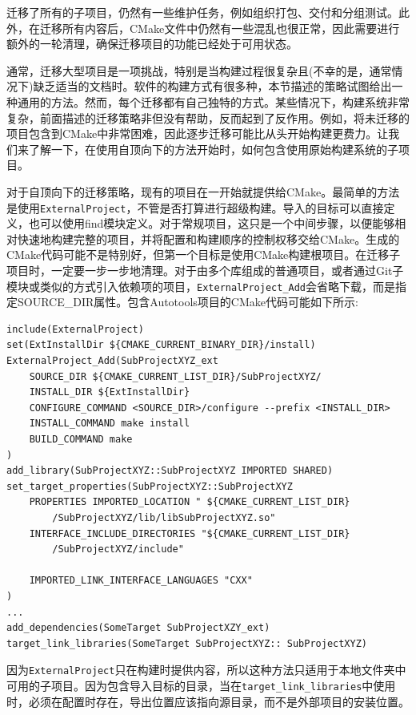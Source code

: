 迁移了所有的子项目，仍然有一些维护任务，例如组织打包、交付和分组测试。此外，在迁移所有内容后，CMake文件中仍然有一些混乱也很正常，因此需要进行额外的一轮清理，确保迁移项目的功能已经处于可用状态。

通常，迁移大型项目是一项挑战，特别是当构建过程很复杂且(不幸的是，通常情况下)缺乏适当的文档时。软件的构建方式有很多种，本节描述的策略试图给出一种通用的方法。然而，每个迁移都有自己独特的方式。某些情况下，构建系统非常复杂，前面描述的迁移策略非但没有帮助，反而起到了反作用。例如，将未迁移的项目包含到CMake中非常困难，因此逐步迁移可能比从头开始构建更费力。让我们来了解一下，在使用自顶向下的方法开始时，如何包含使用原始构建系统的子项目。


对于自顶向下的迁移策略，现有的项目在一开始就提供给CMake。最简单的方法是使用\texttt{ExternalProject}，不管是否打算进行超级构建。导入的目标可以直接定义，也可以使用find模块定义。对于常规项目，这只是一个中间步骤，以便能够相对快速地构建完整的项目，并将配置和构建顺序的控制权移交给CMake。生成的CMake代码可能不是特别好，但第一个目标是使用CMake构建根项目。在迁移子项目时，一定要一步一步地清理。对于由多个库组成的普通项目，或者通过Git子模块或类似的方式引入依赖项的项目，\texttt{ExternalProject\_Add}会省略下载，而是指定SOURCE\_DIR属性。包含Autotools项目的CMake代码可能如下所示:

\begin{lstlisting}[style=styleCMake]
include(ExternalProject)
set(ExtInstallDir ${CMAKE_CURRENT_BINARY_DIR}/install)
ExternalProject_Add(SubProjectXYZ_ext
	SOURCE_DIR ${CMAKE_CURRENT_LIST_DIR}/SubProjectXYZ/
	INSTALL_DIR ${ExtInstallDir}
	CONFIGURE_COMMAND <SOURCE_DIR>/configure --prefix <INSTALL_DIR>
	INSTALL_COMMAND make install
	BUILD_COMMAND make
)
add_library(SubProjectXYZ::SubProjectXYZ IMPORTED SHARED)
set_target_properties(SubProjectXYZ::SubProjectXYZ
	PROPERTIES IMPORTED_LOCATION " ${CMAKE_CURRENT_LIST_DIR}
		/SubProjectXYZ/lib/libSubProjectXYZ.so"
	INTERFACE_INCLUDE_DIRECTORIES "${CMAKE_CURRENT_LIST_DIR}
		/SubProjectXYZ/include"
	
	IMPORTED_LINK_INTERFACE_LANGUAGES "CXX"
)
...
add_dependencies(SomeTarget SubProjectXZY_ext)
target_link_libraries(SomeTarget SubProjectXYZ:: SubProjectXYZ)
\end{lstlisting}

因为\texttt{ExternalProject}只在构建时提供内容，所以这种方法只适用于本地文件夹中可用的子项目。因为包含导入目标的目录，当在\texttt{target\_link\_libraries}中使用时，必须在配置时存在，导出位置应该指向源目录，而不是外部项目的安装位置。

